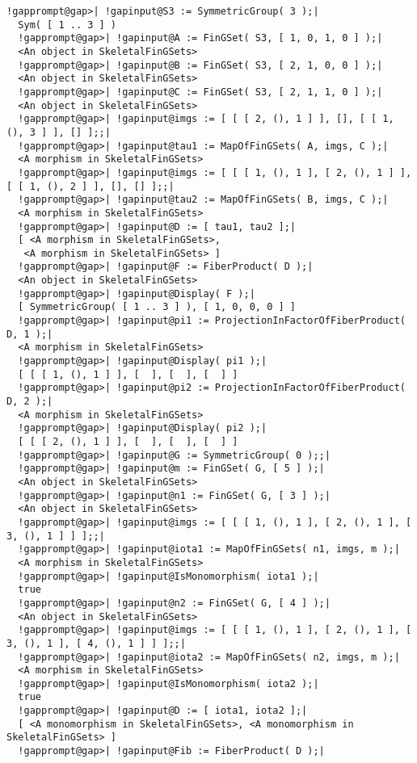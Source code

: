 \documentclass[a4paper,11pt]{report}
\begin{document}
{{{\begin{Verbatim}[commandchars=!@|,fontsize=\small,frame=single,label=Example]
  !gapprompt@gap>| !gapinput@S3 := SymmetricGroup( 3 );|
  Sym( [ 1 .. 3 ] )
  !gapprompt@gap>| !gapinput@A := FinGSet( S3, [ 1, 0, 1, 0 ] );|
  <An object in SkeletalFinGSets>
  !gapprompt@gap>| !gapinput@B := FinGSet( S3, [ 2, 1, 0, 0 ] );|
  <An object in SkeletalFinGSets>
  !gapprompt@gap>| !gapinput@C := FinGSet( S3, [ 2, 1, 1, 0 ] );|
  <An object in SkeletalFinGSets>
  !gapprompt@gap>| !gapinput@imgs := [ [ [ 2, (), 1 ] ], [], [ [ 1, (), 3 ] ], [] ];;|
  !gapprompt@gap>| !gapinput@tau1 := MapOfFinGSets( A, imgs, C );|
  <A morphism in SkeletalFinGSets>
  !gapprompt@gap>| !gapinput@imgs := [ [ [ 1, (), 1 ], [ 2, (), 1 ] ], [ [ 1, (), 2 ] ], [], [] ];;|
  !gapprompt@gap>| !gapinput@tau2 := MapOfFinGSets( B, imgs, C );|
  <A morphism in SkeletalFinGSets>
  !gapprompt@gap>| !gapinput@D := [ tau1, tau2 ];|
  [ <A morphism in SkeletalFinGSets>, 
   <A morphism in SkeletalFinGSets> ]
  !gapprompt@gap>| !gapinput@F := FiberProduct( D );|
  <An object in SkeletalFinGSets>
  !gapprompt@gap>| !gapinput@Display( F );|
  [ SymmetricGroup( [ 1 .. 3 ] ), [ 1, 0, 0, 0 ] ]
  !gapprompt@gap>| !gapinput@pi1 := ProjectionInFactorOfFiberProduct( D, 1 );|
  <A morphism in SkeletalFinGSets>
  !gapprompt@gap>| !gapinput@Display( pi1 );|
  [ [ [ 1, (), 1 ] ], [  ], [  ], [  ] ]
  !gapprompt@gap>| !gapinput@pi2 := ProjectionInFactorOfFiberProduct( D, 2 );|
  <A morphism in SkeletalFinGSets>
  !gapprompt@gap>| !gapinput@Display( pi2 );|
  [ [ [ 2, (), 1 ] ], [  ], [  ], [  ] ]
  !gapprompt@gap>| !gapinput@G := SymmetricGroup( 0 );;|
  !gapprompt@gap>| !gapinput@m := FinGSet( G, [ 5 ] );|
  <An object in SkeletalFinGSets>
  !gapprompt@gap>| !gapinput@n1 := FinGSet( G, [ 3 ] );|
  <An object in SkeletalFinGSets>
  !gapprompt@gap>| !gapinput@imgs := [ [ [ 1, (), 1 ], [ 2, (), 1 ], [ 3, (), 1 ] ] ];;|
  !gapprompt@gap>| !gapinput@iota1 := MapOfFinGSets( n1, imgs, m );|
  <A morphism in SkeletalFinGSets>
  !gapprompt@gap>| !gapinput@IsMonomorphism( iota1 );|
  true
  !gapprompt@gap>| !gapinput@n2 := FinGSet( G, [ 4 ] );|
  <An object in SkeletalFinGSets>
  !gapprompt@gap>| !gapinput@imgs := [ [ [ 1, (), 1 ], [ 2, (), 1 ], [ 3, (), 1 ], [ 4, (), 1 ] ] ];;|
  !gapprompt@gap>| !gapinput@iota2 := MapOfFinGSets( n2, imgs, m );|
  <A morphism in SkeletalFinGSets>
  !gapprompt@gap>| !gapinput@IsMonomorphism( iota2 );|
  true
  !gapprompt@gap>| !gapinput@D := [ iota1, iota2 ];|
  [ <A monomorphism in SkeletalFinGSets>, <A monomorphism in SkeletalFinGSets> ]
  !gapprompt@gap>| !gapinput@Fib := FiberProduct( D );|

\end{Verbatim}}}}
\end{document}
